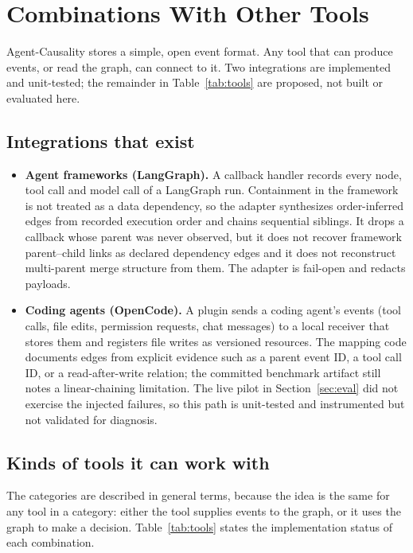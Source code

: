 \documentclass[11pt]{article}
\begin{document}
\section{Combinations With Other Tools}\label{sec:combined}
Agent-Causality stores a simple, open event format. Any tool that can produce events, or read the graph, can connect to it. Two integrations are implemented and unit-tested; the remainder in Table~\ref{tab:tools} are proposed, not built or evaluated here.

\subsection{Integrations that exist}\label{sec:integrations}
\begin{itemize}
\item \textbf{Agent frameworks (LangGraph).} A callback handler records every node, tool call and model call of a LangGraph run. Containment in the framework is not treated as a data dependency, so the adapter synthesizes order-inferred edges from recorded execution order and chains sequential siblings. It drops a callback whose parent was never observed, but it does not recover framework parent--child links as declared dependency edges and it does not reconstruct multi-parent merge structure from them. The adapter is fail-open and redacts payloads.

\vspace{1em}   

\item \textbf{Coding agents (OpenCode).} A plugin sends a coding agent's events (tool calls, file edits, permission requests, chat messages) to a local receiver that stores them and registers file writes as versioned resources. The mapping code documents edges from explicit evidence such as a parent event ID, a tool call ID, or a read-after-write relation; the committed benchmark artifact still notes a linear-chaining limitation. The live pilot in Section~\ref{sec:eval} did not exercise the injected failures, so this path is unit-tested and instrumented but not validated for diagnosis.
\end{itemize}

\subsection{Kinds of tools it can work with}
The categories are described in general terms, because the idea is the same for any tool in a category: either the tool supplies events to the graph, or it uses the graph to make a decision. Table~\ref{tab:tools} states the implementation status of each combination.
\end{document}
